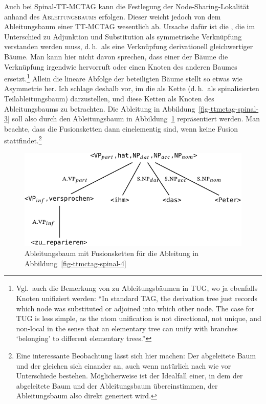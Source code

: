 Auch bei Spinal-TT-MCTAG kann die Festlegung der Node-Sharing-Loka\-li\-tät anhand des \textsc{Ableitungsbaums} erfolgen. Dieser weicht jedoch von dem Ableitungsbaum einer TT-MC\-TAG wesentlich ab. Ursache dafür ist die , die im Unterschied zu Adjunktion und Substitution als symmetrische Verknüpfung verstanden werden muss, d.\,h.\ als eine Verknüpfung derivationell gleichwertiger Bäume. Man kann hier nicht davon sprechen, dass einer der Bäume die Verknüpfung irgendwie hervorruft oder einen Knoten des anderen Baumes ersetzt.\footnote{Vgl.\ auch die Bemerkung von \citet[21]{Gerdes:04} zu Ableitungsbäumen in TUG, wo ja ebenfalls Knoten unifiziert werden: "`In  standard TAG, the derivation tree just records which node was substituted or adjoined into which other node. The case for TUG is less simple, as the atom unification is not directional, not unique, and non-local in the sense that an elementary tree can unify with branches `belonging' to different elementary trees."' } Allein die lineare Abfolge der beteiligten Bäume stellt so etwas wie Asymmetrie her. Ich schlage deshalb vor, im  die  als Kette (d.\,h.\ als spinalisierten Teilableitungsbaum) darzustellen, und diese Ketten als Knoten des Ableitungsbaums zu betrachten. Die Ableitung in Abbildung~\ref{fig-ttmctag-spinal-3} soll also durch den Ableitungsbaum in Abbildung~\ref{fig-ttmctag-spinal-5} repräsentiert werden. Man beachte, dass die Fusionsketten dann einelementig sind, wenn keine Fusion stattfindet.\footnote{Eine interessante Beobachtung lässt sich hier machen: Der abgeleitete Baum und der  gleichen sich einander an, auch wenn natürlich nach wie vor Unterschiede bestehen. Möglicherweise ist der Idealfall einer, in dem der abgeleitete Baum und der Ableitungsbaum übereinstimmen, der Ableitungsbaum also direkt generiert wird.} 
\begin{figure}[t]
\centering
\includegraphics{graphics/abb748.pdf}
\caption{\label{fig-ttmctag-spinal-5}Ableitungsbaum mit Fusionsketten für die Ableitung in Abbildung~\ref{fig-ttmctag-spinal-4}}
\end{figure}


